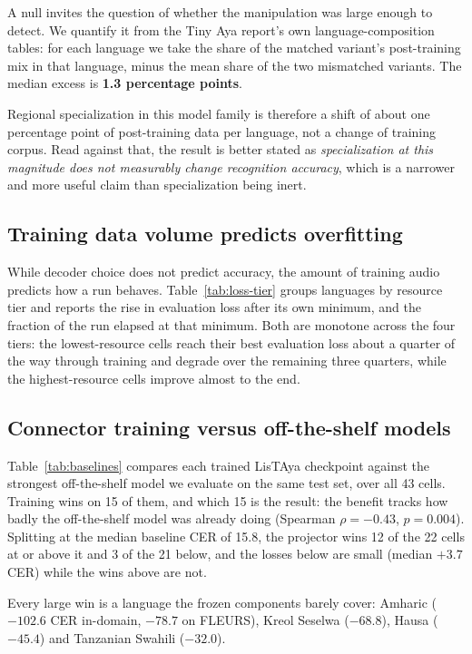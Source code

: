 \documentclass[11pt]{article}
\begin{document}
A null invites the question of whether the manipulation was large enough to detect. We quantify
it from the Tiny Aya report's own language-composition tables: for each language we take the
share of the matched variant's post-training mix in that language, minus the mean share of the
two mismatched variants. The median excess is \textbf{1.3 percentage points}.

Regional specialization in this model family is therefore a shift of about one percentage point
of post-training data per language, not a change of training corpus. Read against that, the
result is better stated as \emph{specialization at this magnitude does not measurably change
recognition accuracy}, which is a narrower and more useful claim than specialization being
inert.

\subsection{Training data volume predicts overfitting}

While decoder choice does not predict accuracy, the amount of training audio predicts how a run
behaves. Table~\ref{tab:loss-tier} groups languages by resource tier and reports the rise in
evaluation loss after its own minimum, and the fraction of the run elapsed at that minimum. Both
are monotone across the four tiers: the lowest-resource cells reach their best evaluation loss
about a quarter of the way through training and degrade over the remaining three quarters, while
the highest-resource cells improve almost to the end.



\subsection{Connector training versus off-the-shelf models}

Table~\ref{tab:baselines} compares each trained LisTAya checkpoint against the strongest
off-the-shelf model we evaluate on the same test set, over all 43 cells.
Training wins on 15 of them, and which 15 is the result: the benefit tracks how badly the
off-the-shelf model was already doing (Spearman $\rho = -0.43$, $p = 0.004$). Splitting at the
median baseline CER of 15.8, the projector wins 12 of the 22 cells at or above it and 3 of the
21 below, and the losses below are small (median $+3.7$ CER) while the wins above are not.

Every large win is a language the frozen components barely cover: Amharic ($-102.6$ CER
in-domain, $-78.7$ on FLEURS), Kreol Seselwa ($-68.8$), Hausa ($-45.4$) and Tanzanian Swahili
($-32.0$).
\end{document}
